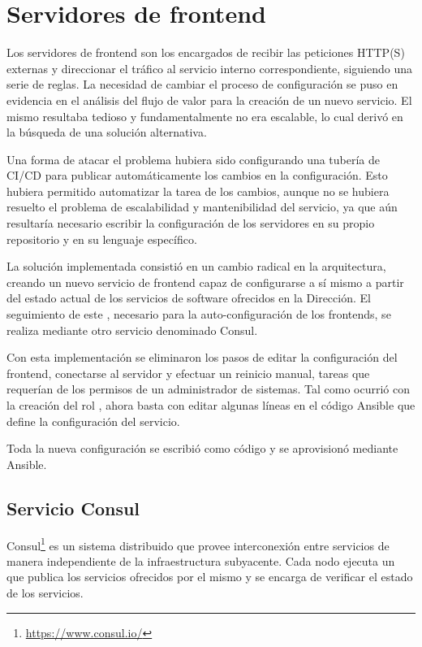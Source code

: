 \section{Servidores de frontend}
%
Los servidores de frontend son los encargados de recibir las
peticiones HTTP(S) externas y direccionar el tráfico al servicio
interno correspondiente, siguiendo una serie de reglas. La necesidad
de cambiar el proceso de configuración se puso en evidencia en el
análisis del flujo de valor para la creación de un nuevo servicio. El
mismo resultaba tedioso y fundamentalmente no era escalable, lo cual
derivó en la búsqueda de una solución alternativa.

Una forma de atacar el problema hubiera sido configurando una tubería
de CI/CD para publicar automáticamente los cambios en la
configuración. Esto hubiera permitido automatizar la tarea de
 los cambios, aunque no se hubiera resuelto el
problema de escalabilidad y mantenibilidad del servicio, ya que aún
resultaría necesario escribir la configuración de los servidores en su
propio repositorio y en su lenguaje específico.

La solución implementada consistió en un cambio radical en la
arquitectura, creando un nuevo servicio de frontend capaz de
configurarse a sí mismo a partir del estado actual de los servicios de
software ofrecidos en la Dirección. El seguimiento de este
, necesario para la auto-configuración de los
frontends, se realiza mediante otro servicio denominado Consul.

Con esta implementación se eliminaron los pasos de editar la
configuración del frontend, conectarse al servidor y efectuar un
reinicio manual, tareas que requerían de los permisos de un
administrador de sistemas. Tal como ocurrió con la creación del rol
, ahora basta con editar algunas líneas en el código
Ansible que define la configuración del servicio.

Toda la nueva configuración se escribió como código y se aprovisionó
mediante Ansible.
%
\subsection{Servicio Consul}
%
Consul\footnote{\url{https://www.consul.io/}} es un sistema
distribuido que provee interconexión entre servicios de manera
independiente de la infraestructura subyacente. Cada nodo ejecuta un
 que publica los servicios ofrecidos por el mismo y se
encarga de verificar el estado de los servicios.

